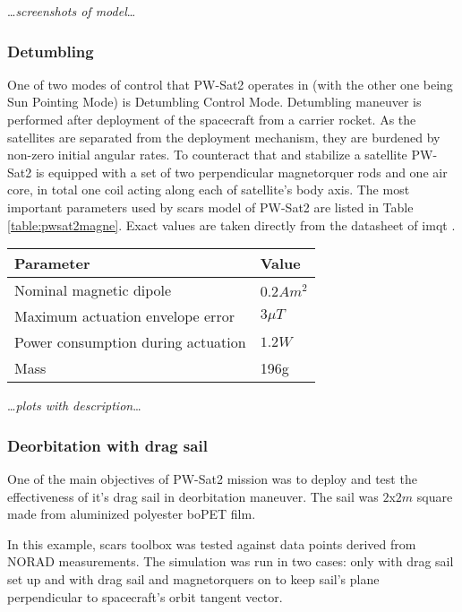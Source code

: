         \dots\textit{screenshots of model}\dots

        \subsubsection{Detumbling}
            One of two modes of control that PW-Sat2 operates in (with the other one being Sun Pointing Mode) is Detumbling Control Mode. Detumbling maneuver is performed after deployment of the spacecraft from a carrier rocket. As the satellites are separated from the deployment mechanism, they are burdened by non-zero initial angular rates. To counteract that and stabilize a satellite PW-Sat2 is equipped with a set of two perpendicular magnetorquer rods and one air core, in total one coil acting along each of satellite's body axis. The most important parameters used by \ac{scars} model of PW-Sat2 are listed in Table \ref{table:pwsat2magne}.\cite{pwsat2adcs} Exact values are taken directly from the datasheet of \ac{imqt} \cite{imqt-datasheet}.

                \begin{center}    
                    \small
                    \begin{tabular}{l l}
                        \textbf{Parameter} & \textbf{Value} \\ \hline
                        Nominal magnetic dipole & $0.2 Am^2$ \\
                        Maximum actuation envelope error & $3\mu T$ \\
                        Power consumption during actuation & $1.2W$ \\
                        Mass & 196g
                    \end{tabular}
                \end{center}\label{table:pwsat2magne}

                \dots\textit{plots with description}\dots

        \subsubsection{Deorbitation with drag sail}
            One of the main objectives of PW-Sat2 mission was to deploy and test the effectiveness of it's drag sail in deorbitation maneuver. The sail was  $2$x$2m$ square made from aluminized polyester boPET film.\cite{pwsat2dt}
            
            In this example, \ac{scars} toolbox was tested against data points derived from NORAD measurements. The simulation was run in two cases: only with drag sail set up and with drag sail and magnetorquers on to keep sail's plane perpendicular to spacecraft's orbit tangent vector.
            
